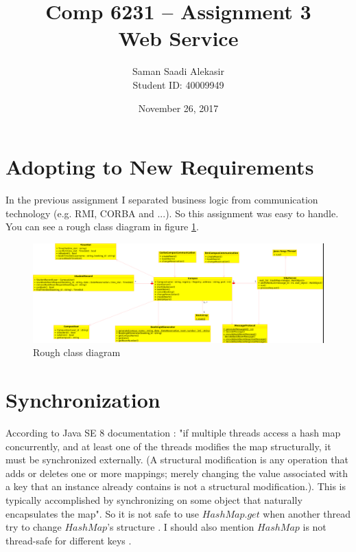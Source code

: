 \documentclass[12pt]{article}
\title{Comp 6231 -- Assignment 3\\Web Service}
\author{Saman Saadi Alekasir\\Student ID: 40009949}
\date{November 26, 2017}
\begin{document}
\begin{titlepage}
\clearpage
{}
\maketitle
\thispagestyle{empty}
\end{titlepage}

\section{Adopting to New Requirements}
In the previous assignment I separated business logic from communication technology (e.g. RMI, CORBA and ...). So this assignment was easy to handle. You can see a rough class diagram in figure \ref{fig:class_diagram}.

\begin{figure}
\caption{Rough class diagram}
\centering
\label{fig:class_diagram}
\includegraphics[width=\linewidth]{img/class_diagram.png}
\end{figure}

\section{Synchronization}
According to Java SE 8 documentation \cite{hashmap}: "if multiple threads access a hash map concurrently, and at least one of the threads modifies the map structurally, it must be synchronized externally. (A structural modification is any operation that adds or deletes one or more mappings; merely changing the value associated with a key that an instance already contains is not a structural modification.). This is typically accomplished by synchronizing on some object that naturally encapsulates the map". So it is not safe to use $HashMap.get$ when another thread try to change $HashMap$'s structure \cite{hashmap-multithread-get}. I should also mention $HashMap$ is not thread-safe for different keys \cite{hashmap-multithread-different-keys}.
\end{document}
